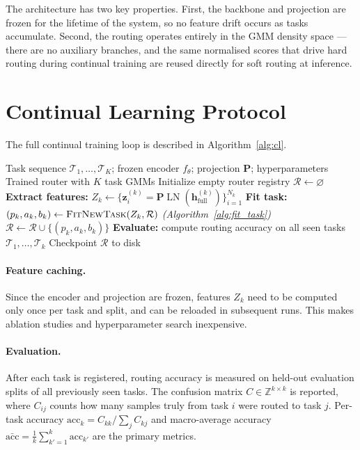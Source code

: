 \documentclass[12pt,a4paper]{article}
\begin{document}
The architecture has two key properties.
First, the backbone and projection are frozen for the lifetime of the system, so no feature drift occurs as tasks accumulate.
Second, the routing operates entirely in the GMM density space — there are no auxiliary branches, and the same normalised scores that drive hard routing during continual training are reused directly for soft routing at inference.

\section{Continual Learning Protocol}
\label{sec:cl}

The full continual training loop is described in Algorithm~\ref{alg:cl}.

\begin{algorithm}[t]
\caption{Continual Routing Training}
\label{alg:cl}
\begin{algorithmic}[1]
\Require Task sequence $\mathcal{T}_1, \ldots, \mathcal{T}_K$; frozen encoder $f_\theta$; projection $\mathbf{P}$; hyperparameters
\Ensure Trained router with $K$ task GMMs
\State Initialize empty router registry $\mathcal{R} \gets \varnothing$
    \State \textbf{Extract features:} $Z_k \gets \{\mathbf{z}_i^{(k)} = \mathbf{P}\operatorname{LN}(\mathbf{h}^{(k)}_{\mathrm{full}})\}_{i=1}^{N_k}$
    \State \textbf{Fit task:} $(p_k, a_k, b_k) \gets \textsc{FitNewTask}(Z_k, \mathcal{R})$  \hfill\textit{(Algorithm~\ref{alg:fit_task})}
    \State $\mathcal{R} \gets \mathcal{R} \cup \{(p_k, a_k, b_k)\}$
    \State \textbf{Evaluate:} compute routing accuracy on all seen tasks $\mathcal{T}_1,\ldots,\mathcal{T}_k$
    \State Checkpoint $\mathcal{R}$ to disk
\EndFor
\end{algorithmic}
\end{algorithm}

\paragraph{Feature caching.}
Since the encoder and projection are frozen, features $Z_k$ need to be computed only once per task and split, and can be reloaded in subsequent runs.
This makes ablation studies and hyperparameter search inexpensive.

\paragraph{Evaluation.}
After each task is registered, routing accuracy is measured on held-out evaluation splits of all previously seen tasks.
The confusion matrix $C \in \mathbb{Z}^{k \times k}$ is reported, where $C_{ij}$ counts how many samples truly from task $i$ were routed to task $j$.
Per-task accuracy $\mathrm{acc}_k = C_{kk}/\sum_j C_{kj}$ and macro-average accuracy $\bar{\mathrm{acc}} = \frac{1}{k}\sum_{k'=1}^k \mathrm{acc}_{k'}$ are the primary metrics.
\end{document}
